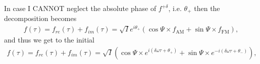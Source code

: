 \documentclass[10pt,letterpaper]{article}
\def\dw{\delta\omega}
\begin{document}
In case I CANNOT neglect the absolute phase of $f^{+\delta}$, i.e. $\theta_+$ then the decomposition becomes
\begin{eqnarray}
f(\tau) = f_{re}(\tau) +f_{im}(\tau) = \sqrt{I}e^{i\theta_+}\left(\cos\Psi \times f_{\text{AM}} + \sin\Psi \times f_{\text{FM}}\right),  
\end{eqnarray}
and thus we get to the initial 
\begin{eqnarray}
f(\tau) = f_{re}(\tau) +f_{im}(\tau) = \sqrt{I}\left(\cos\Psi \times e^{i(\dw\tau+\theta_+)} + \sin\Psi \times e^{-i(\dw\tau+\theta_-)}\right),  
\end{eqnarray}
\end{document}
